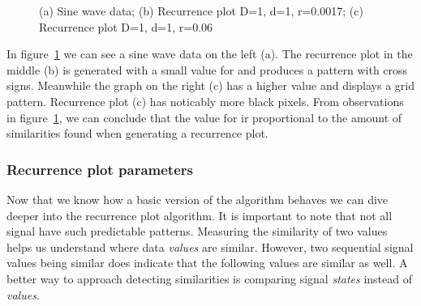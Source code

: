 \documentclass[a4paper,12pt,fleqn]{article}
\begin{document}
\begin{figure}[ht!]
  \hspace{\fill}
  \hspace{\fill}
  \caption{\label{fig:theory_sin}(a) Sine wave data; (b) Recurrence plot D=1, d=1, r=0.0017; (c) Recurrence plot D=1, d=1, r=0.06}
\end{figure}
In figure~\ref{fig:theory_sin} we can see a sine wave data on the left (a). 
The recurrence plot in the middle (b) is generated with a small value for  and produces a pattern with cross signs.
Meanwhile the graph on the right (c) has a higher  value and displays a grid pattern.
Recurrence plot (c) has noticably more black pixels.
From observations in figure~\ref{fig:theory_sin}, we can conclude that the value for  ir proportional to the amount of similarities found when generating a recurrence plot.

\subsubsection{Recurrence plot parameters}
Now that we know how a basic version of the algorithm behaves we can dive deeper into the recurrence plot algorithm.
It is important to note that not all signal have such predictable patterns.
Measuring the similarity of two values helps us understand where data \emph{values} are similar.
However, two sequential signal values being similar does indicate that the following values are similar as well.
A better way to approach detecting similarities is comparing signal \emph{states} instead of \emph{values}.
\end{document}
